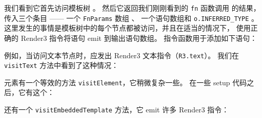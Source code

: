 


我们看到它首先访问模板树 。
然后它返回我们刚刚看到的 \texttt{fn} 函数调用  的结果，
传入三个条目 ——  一个 \texttt{FnParams} 数组 、
一个语句数组和 \texttt{o.INFERRED\_TYPE} 。
这里发生的事情是模板树中的每个节点都被访问，并且在适当的情况下，
使用正确的 Render3 指令将语句 emit 到输出语句数组。
指令函数用于添加如下语句：




例如，当访问文本节点时，应发出 Render3 文本指令（\texttt{R3.text}）。
我们在 \texttt{visitText} 方法中看到了这种情况：




元素有一个等效的方法 \texttt{visitElement}，它稍微复杂一些。
在一些 setup 代码之后，它有这个：




还有一个 \texttt{visitEmbeddedTemplate} 方法，它 emit 许多 Render3 指令：


